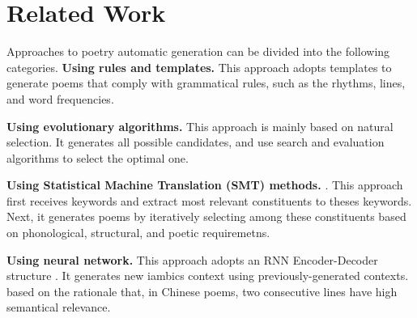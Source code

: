 \section{Related Work}  
%
Approaches to poetry automatic generation can be divided into the following categories.
\textbf{Using rules and templates.}
%
This approach adopts templates to generate poems that comply with grammatical rules, such as the rhythms, lines, and word frequencies\cite{wu2009new,tosa2008hitch}. 

\textbf {Using evolutionary algorithms.} This approach is mainly based on natural selection. It generates all possible candidates, and use search and evaluation algorithms to select the optimal one\cite{manurung2004evolutionary,manurung2012using}.
%

\textbf{Using Statistical Machine Translation (SMT) methods.}
\cite{jiang2008generating}. This approach first receives keywords and extract most relevant constituents to theses keywords.  Next, it generates poems by iteratively selecting among these constituents based on phonological,
structural, and poetic requiremetns.

\textbf{Using neural network.}  This approach adopts an RNN Encoder-Decoder structure \cite{wang2016chinese,bahdanau2014neural}. 
%
It generates new iambics context using previously-generated contexts. based on the rationale  that, in Chinese poems, two consecutive lines have high semantical relevance.
  
